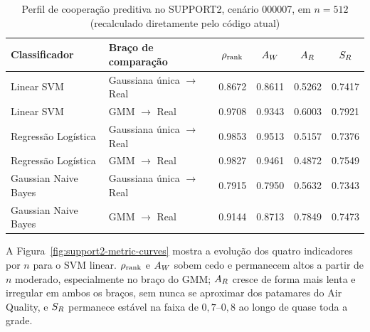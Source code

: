 \begin{table}[H]
  \centering
  \caption{Perfil de cooperação preditiva no SUPPORT2, cenário 000007, em $n=512$ (recalculado diretamente pelo código atual)}
  \label{tab:support2-original}
  \begin{adjustbox}{max width=\textwidth}
  \begin{tabular}{llSSSS}
    \toprule
    Classificador & Braço de comparação & {$\rho_{\mathrm{rank}}$} & {$A_W$} & {$A_R$} & {$S_R$} \\
    \midrule
    Linear SVM & Gaussiana única $\rightarrow$ Real & 0.8672 & 0.8611 & 0.5262 & 0.7417 \\
    Linear SVM & GMM $\rightarrow$ Real             & 0.9708 & 0.9343 & 0.6003 & 0.7921 \\
    Regressão Logística & Gaussiana única $\rightarrow$ Real & 0.9853 & 0.9513 & 0.5157 & 0.7376 \\
    Regressão Logística & GMM $\rightarrow$ Real             & 0.9827 & 0.9461 & 0.4872 & 0.7549 \\
    Gaussian Naive Bayes & Gaussiana única $\rightarrow$ Real & 0.7915 & 0.7950 & 0.5632 & 0.7343 \\
    Gaussian Naive Bayes & GMM $\rightarrow$ Real             & 0.9144 & 0.8713 & 0.7849 & 0.7473 \\
    \bottomrule
  \end{tabular}
  \end{adjustbox}
\end{table}

A Figura~\ref{fig:support2-metric-curves} mostra a evolução dos quatro indicadores por $n$ para o SVM linear. $\rho_{\mathrm{rank}}$ e $A_W$ sobem cedo e permanecem altos a partir de $n$ moderado, especialmente no braço do GMM; $A_R$ cresce de forma mais lenta e irregular em ambos os braços, sem nunca se aproximar dos patamares do Air Quality, e $S_R$ permanece estável na faixa de $0{,}7$--$0{,}8$ ao longo de quase toda a grade.

